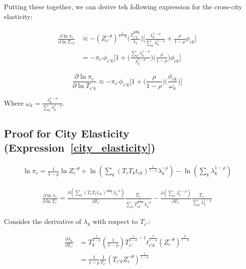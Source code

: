 \documentclass[10pt]{article}
\begin{document}
Putting these together, we can derive teh following expression for the cross-city elasticity:

\begin{align*}
    \frac{\partial\ln{\pi_{c}}}{\partial\ln{T_{{c'}k}}} & \approx - (Z_{c'}^{-\theta})^{\frac{1}{1-\rho}}\Bigg(\frac{T_{{c'}k}^{\frac{1}{1-\rho}}}{\lambda_{k}}\Bigg)\Bigg[\frac{\lambda_{k}^{1-\rho}}{\sum\limits_{k}{\lambda_{k}^{1-\rho}}} + \frac{\rho}{1-\rho}\phi_{ck}\Bigg] \\ &= -{\pi_{c'}}{\phi_{{c'}k}}\Bigg[1+\Bigg(\frac{\sum\limits_{k}{\lambda_{k}^{1-\rho}}}{\lambda_{k}^{1-\rho}}\Bigg)\Bigg(\frac{\rho}{1-\rho}\Bigg)\phi_{ck}\Bigg]
\end{align*}

\begin{equation*}
    \frac{\partial\ln{\pi_{c}}}{\partial\ln{T_{{c'}k}}} \approx -{\pi_{c'}}{\phi_{{c'}k}}\Big[1+\Big(\frac{\rho}{1-\rho}\Big)\Big(\frac{\phi_{ck}}{\omega_{k}}\Big)\Big]
\end{equation*}

Where $\omega_k = \frac{\lambda_k^{1 - \rho}}{\sum_{k}^{} \lambda_k^{1 - \rho}}$.

\subsection{Proof for City Elasticity (Expression~\ref{city_elasticity})}

\begin{align*}
    \ln \pi_c = \frac{1}{1 - \rho} \ln Z_c^{- \theta} + \ln \left( \sum_{k}^{} (T_c T_k t_{ck})^{\frac{1}{1 - \rho}} \lambda_k^{- \rho} \right) - \ln \left( \sum_{k}^{} \lambda_k^{1 - \rho} \right)
\end{align*}

\begin{align*}
    \frac{\partial \ln \pi_c}{\partial \ln T_{c'}} = \frac{\partial \left( \sum_{k}^{} (T_c T_k t_{ck})^{\frac{1}{1 - \rho}} \lambda_k^{- \rho} \right)}{\partial T_{c'}} \frac{T_{c'}}{\sum_{k}^{} T_{ck}^{\frac{1}{1 - \rho}} \lambda_k^{- \rho}} - \frac{\partial \left( \sum_{k}^{} \lambda_k^{1 - \rho} \right)}{\partial T_{c'}} \frac{T_{c'}}{\sum_{k}^{} \lambda_k^{1 - \rho}}
\end{align*}

Consider the derivative of $\lambda_k$ with respect to $T_{c'}$:

\begin{align*}
    \frac{\partial \lambda_k}{\partial T_{c'}} & = T_k^{\frac{1}{1 - \rho}} \left( \frac{1}{1 - \rho} \right) T_{c'}^{\frac{1}{1 - \rho} - 1} t_{c'k}^{\frac{1}{1 - \rho}} (Z_c^{- \theta})^{\frac{\rho}{1 - \rho}} \\
                                               & = \frac{1}{1 - \rho} \frac{1}{T_{c'}} (T_{c'k} Z_c^{- \theta})^{\frac{1}{1 - \rho}}
\end{align*}
\end{document}
